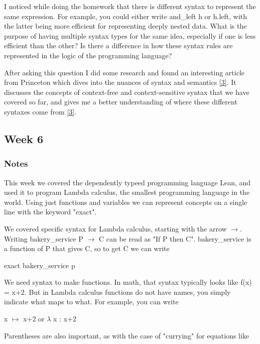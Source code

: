 \documentclass{article}
\theoremstyle{theorem}
\theoremstyle{definition}
\theoremstyle{remark}
\begin{document}
\hspace{0.65cm}I noticed while doing the homework that there is different syntax to represent the same expression. For example, you could either write and\_left h or h.left, with the latter being more efficient for representing deeply nested data. What is the purpose of having multiple syntax types for the same idea, especially if one is less efficient than the other? Is there a difference in how these syntax rules are represented in the logic of the programming language?

\hspace{0.65cm}After asking this question I did some research and found an interesting article from Princeton which dives into the nuances of syntax and semantics \hyperref[3]{[3]}. It discusses the concepts of context-free and context-sensitive syntax that we have covered so far, and gives me a better understanding of where these different syntaxes come from \hyperref[3]{[3]}.

\subsection{Week 6}
\subsubsection{Notes}
This week we covered the dependently typeed programming language Lean, and used it to program Lambda calculus, 
the smallest programming language in the world. Using just functions and variables we can represent concepts on a single line with the keyword "exact".

\hspace{0.65cm}We covered specific syntax for Lambda calculus, starting with the arrow $\rightarrow$. Writing bakery\_service P $\rightarrow$ C can be read as "If P then C". bakery\_service is a function of P that gives C, so to get C we can write 

\hspace{7cm}exact bakery\_service p

\hspace{0.65cm}We need syntax to make functions. In math, that syntax typically looks like f(x) = x+2. But in Lambda calculus functions do not have names, you simply indicate what maps to what. For example, you can write

\hspace{7cm}x $\mapsto$ x+2 or $\lambda$ x : x+2

\hspace{0.65cm}Parentheses are also important, as with the case of "currying" for equations like 
\end{document}
